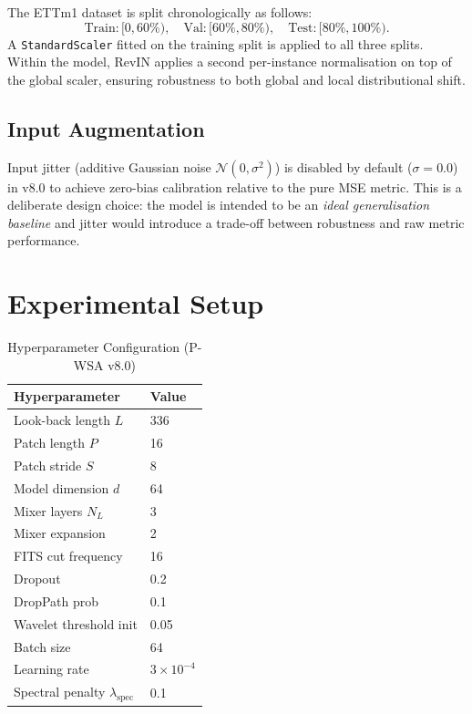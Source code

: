 \documentclass[11pt, letterpaper]{article}
\begin{document}
The ETTm1 dataset is split chronologically as follows:
\[
  \text{Train}: [0, 60\%),\quad \text{Val}: [60\%, 80\%),\quad \text{Test}: [80\%, 100\%).
\]
A \texttt{StandardScaler} fitted on the training split is applied to all three splits. Within the model, RevIN applies a second per-instance normalisation on top of the global scaler, ensuring robustness to both global and local distributional shift.

\subsection{Input Augmentation}

Input jitter (additive Gaussian noise $\mathcal{N}(0, \sigma^2)$) is disabled by default ($\sigma = 0.0$) in v8.0 to achieve zero-bias calibration relative to the pure MSE metric. This is a deliberate design choice: the model is intended to be an \textit{ideal generalisation baseline} and jitter would introduce a trade-off between robustness and raw metric performance.

\section{Experimental Setup}
\label{sec:exp}

\begin{table}[H]
\centering
\caption{Hyperparameter Configuration (P-WSA v8.0)}
\label{tab:hparams}
\renewcommand{\arraystretch}{1.4}
\sffamily
\begin{tabular}{@{}p{5.5cm}p{3.5cm}@{}}
\toprule
\textbf{Hyperparameter} & \textbf{Value} \\
\midrule
Look-back length $L$    & 336 \\
Patch length $P$        & 16 \\
Patch stride $S$        & 8 \\
Model dimension $d$     & 64 \\
Mixer layers $N_L$      & 3 \\
Mixer expansion         & 2 \\
FITS cut frequency      & 16 \\
Dropout                 & 0.2 \\
DropPath prob           & 0.1 \\
Wavelet threshold init  & 0.05 \\
Batch size              & 64 \\
Learning rate           & $3 \times 10^{-4}$ \\
Spectral penalty $\lambda_\text{spec}$ & 0.1 \\
\bottomrule
\end{tabular}
\end{table}
\end{document}
